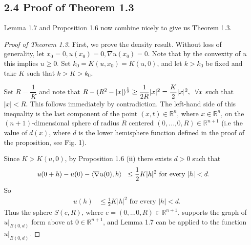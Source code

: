 \documentclass[10pt]{article}
\begin{document}
\subsection{2.4 Proof of Theorem 1.3}
Lemma 1.7 and Proposition 1.6 now combine nicely to give us Theorem 1.3.
\begin{proof}[Proof of Theorem 1.3]
First, we prove the density result. Without loss of generality, let $x_0=0, u(x_0)=0, \nabla u(x_0)=0$. Note that by the convexity of $u$ this implies $u\geq 0$. Set $k_0=K(u,x_0)=K(u,0)$, and let $k>k_0$ be fixed and take $K$ such that $k>K>k_0$.

Set $R=\dfrac{1}{K}$ and note that $R -(R^{2}-|x|)^{\frac{1}{2}}\geq \dfrac{1}{2R} |x|^{2}=\dfrac{K}{2} |x|^{2}, \hspace{2mm} \forall x$ such that $|x|<R$. This follows immediately by contradiction. The left-hand side of this inequality is the  last component of the point $(x,t)\in \mathbb{R}^{n}$, where $x\in \mathbb{R}^{n}$, on the $(n+1)$-dimensional sphere of radius $R$ centered $(0,...,0,R) \in \mathbb{R}^{n+1}$ (i.e the value of $d(x)$, where $d$ is the lower hemisphere function defined in the proof of the proposition, see Fig. 1).
\begin{figure}[!h]
\centering
{}
\caption{}

\end{figure}

Since $K>K(u,0)$, by Proposition 1.6 (ii) there exists $d>0$ such that 
\begin{align*}
u(0+h)-u(0)- \langle\nabla u(0),h\rangle \hspace{2mm} &\leq \frac{1}{2}K|h|^{2} \text{ for every } |h|<d.
\end{align*} So
\begin{align*}
u(h)& \leq \frac{1}{2}K|h|^{2} \text{ for every } |h|<d.
\end{align*}
Thus the sphere $S(c,R)$, where $c=(0,...0,R)\in \mathbb{R}^{n+1}$, supports the graph of $u|_{B(0,d)}$ form above at $0\in \mathbb{R}^{n+1}$, and Lemma 1.7 can be applied to the function $u|_{B(0,d)}$.


\end{proof}
\end{document}

